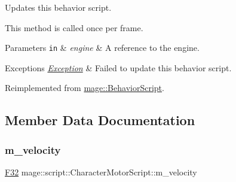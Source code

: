 Updates this behavior script.

This method is called once per frame.


\begin{DoxyParams}[1]{Parameters}
\mbox{\tt in}  & {\em engine} & A reference to the engine. \\
\hline
\end{DoxyParams}

\begin{DoxyExceptions}{Exceptions}
{\em \hyperlink{classmage_1_1_exception}{Exception}} & Failed to update this behavior script. \\
\hline
\end{DoxyExceptions}


Reimplemented from \hyperlink{classmage_1_1_behavior_script_a085634661326b59850c1111e537baa4e}{mage\+::\+Behavior\+Script}.



\subsection{Member Data Documentation}
\hypertarget{classmage_1_1script_1_1_character_motor_script_a30db45f04bc56380729af037e71ff237}{}\label{classmage_1_1script_1_1_character_motor_script_a30db45f04bc56380729af037e71ff237} 
\subsubsection{\texorpdfstring{m\+\_\+velocity}{m\_velocity}}
{\footnotesize\ttfamily \hyperlink{namespacemage_aa97e833b45f06d60a0a9c4fc22ae02c0}{F32} mage\+::script\+::\+Character\+Motor\+Script\+::m\+\_\+velocity\hspace{0.3cm}{\ttfamily [private]}}


